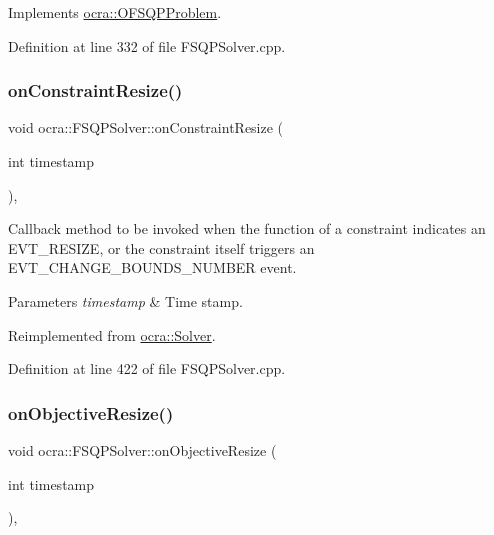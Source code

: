 Implements \hyperlink{classocra_1_1OFSQPProblem_adca0c224eb1b9f6e0c2d17f07277a899}{ocra\+::\+O\+F\+S\+Q\+P\+Problem}.



Definition at line 332 of file F\+S\+Q\+P\+Solver.\+cpp.

\hypertarget{classocra_1_1FSQPSolver_a4bee18cc63de9aabefe747e052662351}{}\label{classocra_1_1FSQPSolver_a4bee18cc63de9aabefe747e052662351} 
\subsubsection{\texorpdfstring{on\+Constraint\+Resize()}{onConstraintResize()}}
{\footnotesize\ttfamily void ocra\+::\+F\+S\+Q\+P\+Solver\+::on\+Constraint\+Resize (\begin{DoxyParamCaption}\item[{int}]{timestamp }\end{DoxyParamCaption})\hspace{0.3cm}{\ttfamily [protected]}, {\ttfamily [virtual]}}

Callback method to be invoked when the function of a constraint indicates an E\+V\+T\+\_\+\+R\+E\+S\+I\+ZE, or the constraint itself triggers an E\+V\+T\+\_\+\+C\+H\+A\+N\+G\+E\+\_\+\+B\+O\+U\+N\+D\+S\+\_\+\+N\+U\+M\+B\+ER event.


\begin{DoxyParams}{Parameters}
{\em timestamp} & Time stamp. \\
\hline
\end{DoxyParams}


Reimplemented from \hyperlink{classocra_1_1Solver_ad74c2f36dcee107636675bb6ff16e26a}{ocra\+::\+Solver}.



Definition at line 422 of file F\+S\+Q\+P\+Solver.\+cpp.

\hypertarget{classocra_1_1FSQPSolver_a87f59b841b1101fd552f7f9de3d3d99d}{}\label{classocra_1_1FSQPSolver_a87f59b841b1101fd552f7f9de3d3d99d} 
\subsubsection{\texorpdfstring{on\+Objective\+Resize()}{onObjectiveResize()}}
{\footnotesize\ttfamily void ocra\+::\+F\+S\+Q\+P\+Solver\+::on\+Objective\+Resize (\begin{DoxyParamCaption}\item[{int}]{timestamp }\end{DoxyParamCaption})\hspace{0.3cm}{\ttfamily [protected]}, {\ttfamily [virtual]}}

